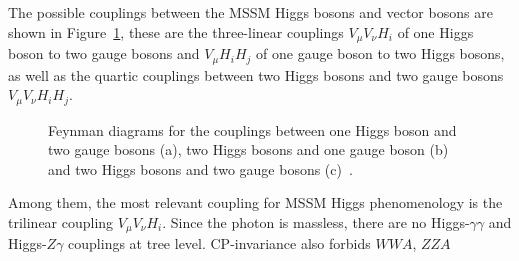The possible couplings between the MSSM Higgs bosons and vector bosons are shown in Figure~\ref{fig:couplings}, these are 
the three-linear couplings $V_{\mu}V_{\nu}H_i$ of one  Higgs boson to two gauge bosons and $V_{\mu}H_{i}H_j$ of one gauge boson to two Higgs bosons,
as well as the quartic couplings between two Higgs bosons and two gauge bosons $V_{\mu}V_{\nu}H_iH_j$.
\begin{figure}[tp]
     \begin{center}
     	\hspace{0.5cm}
     	\hspace{0.5cm}
     \end{center}
   \label{fig:couplings}
    \caption{Feynman diagrams for the couplings between one Higgs boson and two gauge bosons (a), two Higgs bosons and one gauge boson (b)
		and two Higgs bosons and two gauge bosons (c)~\cite{Djuadi}. }
\end{figure}
Among them, the most relevant coupling for MSSM Higgs phenomenology is  the trilinear coupling $V_{\mu}V_{\nu}H_i$.
Since the photon is massless, there are no Higgs-$\gamma\gamma$ and Higgs-$Z\gamma$ couplings at tree level. CP-invariance also forbids $WWA$, $ZZA$
